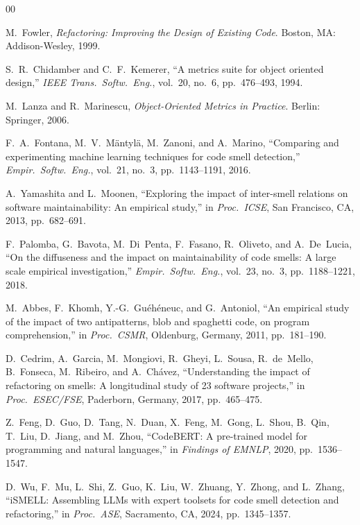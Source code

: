 \documentclass[conference]{IEEEtran}
\begin{document}
\begin{thebibliography}{00}

M.~Fowler,
\emph{Refactoring: Improving the Design of Existing Code}.
Boston, MA: Addison-Wesley, 1999.

S.~R.~Chidamber and C.~F.~Kemerer,
``A metrics suite for object oriented design,''
\emph{IEEE Trans.\ Softw.\ Eng.},
vol.~20, no.~6, pp.~476--493, 1994.

M.~Lanza and R.~Marinescu,
\emph{Object-Oriented Metrics in Practice}.
Berlin: Springer, 2006.

F.~A.~Fontana, M.~V.~M{\"a}ntyl{\"a}, M.~Zanoni, and A.~Marino,
``Comparing and experimenting machine learning techniques for code smell
detection,''
\emph{Empir.\ Softw.\ Eng.}, vol.~21, no.~3, pp.~1143--1191, 2016.

A.~Yamashita and L.~Moonen,
``Exploring the impact of inter-smell relations on software maintainability:
An empirical study,''
in \emph{Proc.\ ICSE}, San Francisco, CA, 2013, pp.~682--691.

F.~Palomba, G.~Bavota, M.~Di~Penta, F.~Fasano, R.~Oliveto,
and A.~De~Lucia,
``On the diffuseness and the impact on maintainability of code smells:
A large scale empirical investigation,''
\emph{Empir.\ Softw.\ Eng.}, vol.~23, no.~3, pp.~1188--1221, 2018.

M.~Abbes, F.~Khomh, Y.-G.~Gu{\'e}h{\'e}neuc, and G.~Antoniol,
``An empirical study of the impact of two antipatterns, blob and spaghetti
code, on program comprehension,''
in \emph{Proc.\ CSMR}, Oldenburg, Germany, 2011, pp.~181--190.

D.~Cedrim, A.~Garcia, M.~Mongiovi, R.~Gheyi, L.~Sousa,
R.~de~Mello, B.~Fonseca, M.~Ribeiro, and A.~Ch{\'a}vez,
``Understanding the impact of refactoring on smells: A longitudinal study
of 23 software projects,''
in \emph{Proc.\ ESEC/FSE}, Paderborn, Germany, 2017, pp.~465--475.

Z.~Feng, D.~Guo, D.~Tang, N.~Duan, X.~Feng, M.~Gong, L.~Shou,
B.~Qin, T.~Liu, D.~Jiang, and M.~Zhou,
``CodeBERT: A pre-trained model for programming and natural languages,''
in \emph{Findings of EMNLP}, 2020, pp.~1536--1547.

D.~Wu, F.~Mu, L.~Shi, Z.~Guo, K.~Liu, W.~Zhuang, Y.~Zhong, and L.~Zhang,
``iSMELL: Assembling LLMs with expert toolsets for code smell detection
and refactoring,''
in \emph{Proc.\ ASE}, Sacramento, CA, 2024, pp.~1345--1357.


\end{thebibliography}
\end{document}
